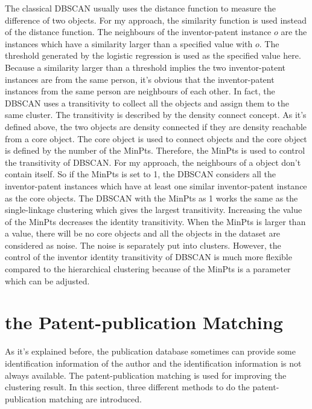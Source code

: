 The classical DBSCAN usually uses the distance function to measure the difference of two objects. For my approach, the similarity function is used instead of the distance function. The neighbours of the inventor-patent instance $o$ are the instances which have a similarity larger than a specified value with $o$. The threshold generated by the logistic regression is used as the specified value here. Because a similarity larger than a threshold implies the two inventor-patent instances are from the same person, it's obvious that the inventor-patent instances from the same person are neighbours of each other. In fact, the DBSCAN uses a transitivity to collect all the objects and assign them to the same cluster. The transitivity is described by the density connect concept. As it's defined above, the two objects are density connected if they are density reachable from a core object. The core object is used to connect objects and the core object is defined by the number of the MinPts.  
Therefore, the MinPts is used to control the transitivity of DBSCAN. For my approach, the neighbours of a object don't contain itself. So if the MinPts is set to 1, the DBSCAN considers all the inventor-patent instances which have at least one similar inventor-patent instance as the core objects. The DBSCAN with the MinPts as 1 works the same as the single-linkage clustering which gives the largest transitivity. Increasing the value of the MinPts  decreases the identity transitivity. When the MinPts is larger than a value, there will be no core objects and all the objects in the dataset are considered as noise. The noise is separately put into clusters. However, the control of the inventor identity transitivity of DBSCAN is much more flexible compared to the hierarchical clustering because of the MinPts is a parameter which can be adjusted.  

\section{the Patent-publication Matching}
As it's explained before, the publication database sometimes can provide some identification information of the author and the identification information is not always available. The patent-publication matching is used for improving the clustering result. In this section, three different methods to do the patent-publication matching are introduced. 

